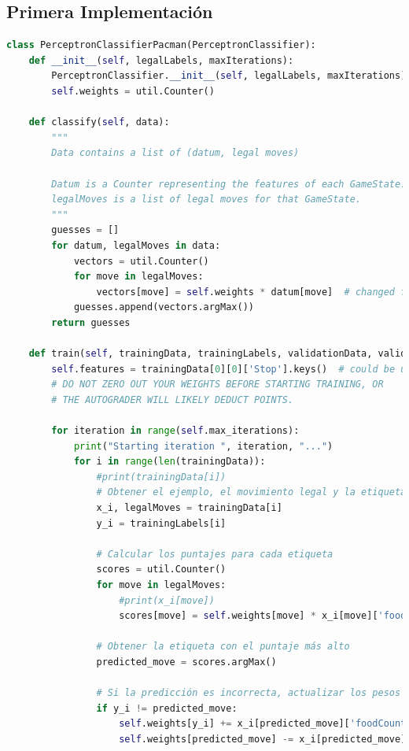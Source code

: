 \documentclass{report}
\begin{document}
      \subsection*{Primera Implementación}
        \begin{lstlisting}[language=Python, caption=Implementación inicial del clonador de comportamiento del pacman]
class PerceptronClassifierPacman(PerceptronClassifier):
    def __init__(self, legalLabels, maxIterations):
        PerceptronClassifier.__init__(self, legalLabels, maxIterations)
        self.weights = util.Counter()

    def classify(self, data):
        """
        Data contains a list of (datum, legal moves)
        
        Datum is a Counter representing the features of each GameState.
        legalMoves is a list of legal moves for that GameState.
        """
        guesses = []
        for datum, legalMoves in data:
            vectors = util.Counter()
            for move in legalMoves:
                vectors[move] = self.weights * datum[move]  # changed from datum to datum[l]
            guesses.append(vectors.argMax())
        return guesses

    def train(self, trainingData, trainingLabels, validationData, validationLabels):
        self.features = trainingData[0][0]['Stop'].keys()  # could be useful later
        # DO NOT ZERO OUT YOUR WEIGHTS BEFORE STARTING TRAINING, OR
        # THE AUTOGRADER WILL LIKELY DEDUCT POINTS.

        for iteration in range(self.max_iterations):
            print("Starting iteration ", iteration, "...")
            for i in range(len(trainingData)):
                #print(trainingData[i])
                # Obtener el ejemplo, el movimiento legal y la etiqueta
                x_i, legalMoves = trainingData[i]
                y_i = trainingLabels[i]
                
                # Calcular los puntajes para cada etiqueta
                scores = util.Counter()
                for move in legalMoves:
                    #print(x_i[move])
                    scores[move] = self.weights[move] * x_i[move]['foodCount']
                
                # Obtener la etiqueta con el puntaje más alto
                predicted_move = scores.argMax()
                
                # Si la predicción es incorrecta, actualizar los pesos
                if y_i != predicted_move:
                    self.weights[y_i] += x_i[predicted_move]['foodCount']
                    self.weights[predicted_move] -= x_i[predicted_move]['foodCount']
        \end{lstlisting}
\end{document}
